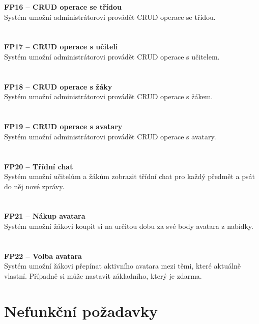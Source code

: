 \documentclass[twoside]{ctuthesis}
\theoremstyle{plain}
\theoremstyle{definition}
\theoremstyle{note}
\begin{document}
\textbf{\Large FP16 -- CRUD operace se třídou}\\
Systém umožní administrátorovi provádět CRUD operace se třídou.
\\\\\\
\textbf{\Large FP17 -- CRUD operace s učiteli}\\
Systém umožní administrátorovi provádět CRUD operace s učitelem.
\\\\\\
\textbf{\Large FP18 -- CRUD operace s žáky}\\
Systém umožní administrátorovi provádět CRUD operace s žákem.
\\\\\\
\textbf{\Large FP19 -- CRUD operace s avatary}\\
Systém umožní administrátorovi provádět CRUD operace s avatary.
\\\\\\
\textbf{\Large FP20 -- Třídní chat}\\
Systém umožní učitelům a žákům zobrazit třídní chat pro každý předmět a psát do něj nové zprávy.
\\\\\\
\textbf{\Large FP21 -- Nákup avatara}\\
Systém umožní žákovi koupit si na určitou dobu za své body avatara z nabídky.
\\\\\\
\textbf{\Large FP22 -- Volba avatara}\\
Systém umožní žákovi přepínat aktivního avatara mezi těmi, které aktuálně vlastní. Případně si může nastavit základního, který je zdarma.






\section{Nefunkční požadavky}
\end{document}
